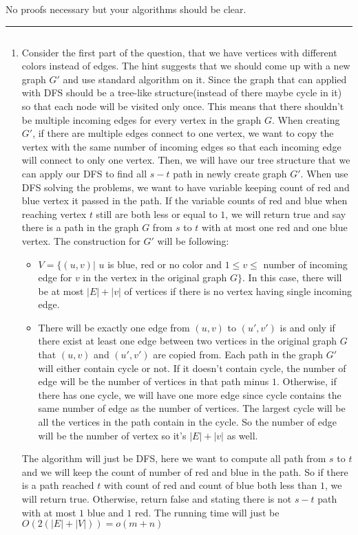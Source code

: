 \documentclass[11pt]{article}
\begin{document}
 No proofs necessary but your algorithms should be clear.
 $$ $$
\hrule
\begin{solution}
$$ $$
\begin{enumerate}
    \item Consider the first part of the question, that we have vertices with different colors instead of edges. The hint suggests that we should come up with a new graph $G'$ and use standard algorithm on it. Since the graph that can applied with DFS should be a tree-like structure(instead of there maybe cycle in it) so that each node will be visited only once. This means that there shouldn't be multiple incoming edges for every vertex in the graph $G$. When creating $G'$, if there are multiple edges connect to one vertex, we want to copy the vertex with the same number of incoming edges so that each incoming edge will connect to only one vertex. Then, we will have our tree structure that we can apply our DFS to find all $s-t$ path in newly create graph $G'$. When use DFS solving the problems, we want to have variable keeping count of red and blue vertex it passed in the path. If the variable counts of red and blue when reaching vertex $t$ still are both less or equal to $1$, we will return true and say there is a path in the graph $G$ from $s$ to $t$ with at most one red and one blue vertex. The construction for $G'$ will be following:
    \begin{itemize}
        \item $V = \{(u,v)|$ $u$ is blue, red or no color and $1 \leq v \leq$ number of incoming edge for $v$ in the vertex in the original graph $G \}$. In this case, there will be at most $|E| + |v|$ of vertices if there is no vertex having single incoming edge.
        \item There will be exactly one edge from $(u,v)$ to $(u',v')$ is and only if there exist at least one edge between two vertices in the original graph $G$ that $(u,v)$ and $(u',v')$ are copied from. Each path in the graph $G'$ will either contain cycle or not. If it doesn't contain cycle, the number of edge will be the number of vertices in that path minus $1$. Otherwise, if there has one cycle, we will have one more edge since cycle contains the same number of edge as the number of vertices. The largest cycle will be all the vertices in the path contain in the cycle. So the number of edge will be the number of vertex so it's $|E| + |v|$ as well.    
    \end{itemize}
    The algorithm will just be DFS, here we want to compute all path from $s$ to $t$ and we will keep the count of number of red and blue in the path. So if there is a path reached $t$ with count of red and count of blue both less than $1$, we will return true. Otherwise, return false and stating there is not $s-t$ path with at most $1$ blue and $1$ red. The running time will just be $O(2(|E| + |V|)) = o(m+n)$

\end{enumerate}
\end{solution}
\end{document}
